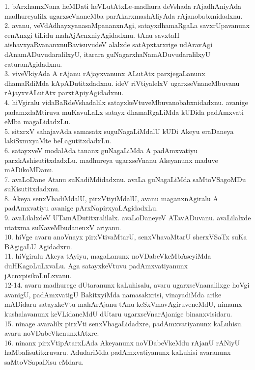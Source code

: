 \documentclass{article}
\begin{document}
1. bArxhamxNana heMDati heVLutAtxLe-madhura deVshada rAjadhAniyAda madhureyalilx ugarxseVnaneMba parAkarxmashAliyAda rAjanobabxnidadxnu.\\
2. avanu, veVdAdhayxyanasaMpananxnAgi, satayxdhamaRgaLa savxrUpavanunx cenAnxgi tiLidu mahAjAcnxniyAgidadxnu. tAnu savxtaH aishavxyaRvananxnuBavisuvudeV alalxde satApxtarxrige udAravAgi dAnamADuvudaralilxyU, itarara guNagarxhaNamADuvudaralilxyU caturanAgidadxnu.\\
3. viveVkiyAda A rAjanu rAjayxvanunx ALutAtx parxjegaLanunx dhamaRdiMda kApADutitxdadxnu. ideV riVtiyalelxV ugarxseVnaneMbuvanu rAjayxvALutAtx parxtApiyAgidadxnu.\\
4. hiVgiralu vidaBaRdeVshadalilx satayxkeVtuveMbuvanobabxnidadxnu. avanige padamxdaMtiruva muKavuLaLx satayx dhamaRgaLiMda kUDida padAmxvati eMba magaLidadxLu.\\
5. sitxrxV sahajavAda samasatx suguNagaLiMdalU kUDi Akeyu eraDaneya lakiSxmxyaMte beLagutitxdadxLu.\\
6. satayxveV modalAda tananx guNagaLiMda A padAmxvatiyu parxkAshisutitxdadxLu. madhureya ugarxseVnanu Akeyanunx maduve mADikoMDanu.\\
7. avaLoDane Atanu suKadiMdidadxnu. avaLa guNagaLiMda saMtoVSagoMDu suKisutitxdadxnu.\\
8. Akeya senxVhadiMdalU, pirxVtiyiMdalU, avanu maganxnAgiralu A padAmxvatiyu avanige pArxNapirxyaLAgidadxLu.\\
9. avaLilalxdeV UTamADutitxralilalx. avaLoDaneyeV ATavADuvanu. avaLilalxde utatxma suKaveMbudanenxV ariyanu.\\
10. hiVge avaru anoVnayx pirxVtivaMtarU, senxVhavaMtarU sherxVSaTx suKa BAgigaLU Agidadxru.\\
11. hiVgiralu Akeya tAyiyu, magaLanunx noVDabeVkeMbAseyiMda duHKagoLuLxvaLu. Aga satayxkeVtuvu padAmxvatiyanunx jAcnxpisikoLuLxvanu.\\
12-14. avaru madhurege dUtaranunx kaLuhisalu, avaru ugarxseVnanalilxge hoVgi avanigU, padAmxvatigU BakitxyiMda namasakxrisi, vinayadiMda arike mADidaru-satayxkeVtu mahArAjanu tAnu keSxVmavAgiruveneMdU, nimamx kushalavanunx keVLidaneMdU dUtaru ugarxseVnarAjanige binanxvisidaru.\\
15. ninage avaralilx pirxVti senxVhagaLidadxre, padAmxvatiyanunx kaLuhisu. avaru noVDabeVkenunxtAtxre.\\
16. ninanx pirxVtipAtarxLAda Akeyanunx noVDabeVkeMdu rAjanU rANiyU haMbalisutitxruvaru. AdudariMda padAmxvatiyanunx kaLuhisi avaranunx saMtoVSapaDisu eMdaru.\\
\end{document}
